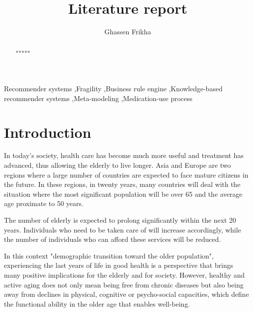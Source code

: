 \documentclass[preprint,3p,times,number]{elsarticle}
\begin{document}
\begin{frontmatter}


\title{Literature report}


\author[Mines-Albi]{Ghassen Frikha}

  
  
 \address[Mines-Albi]{Toulouse University, IMT Mines Albi, Department of Industrial Engineering, Route de Teillet, 81013 Albi Cedex 9, France}

\journal{ *** *** }


\begin{abstract}
*****
\end{abstract}

\begin{keyword} Recommender systems \sep Fragility \sep Business rule engine \sep Knowledge-based recommender systems \sep Meta-modeling \sep Medication-use process


\end{keyword}

\end{frontmatter}

\linenumbers
 \newcommand{\adobprim}{\textsc{adoBPRIM}}
\section{Introduction}
In today's society, health care has become much more useful and treatment has advanced, thus allowing the elderly to live longer. Asia and Europe are two regions where a large number of countries are expected to face mature citizens in the future. In these regions, in twenty years, many countries will deal with the situation where the most significant population will be over 65 and the average age proximate to 50 years. 

The number of elderly is expected to prolong significantly within the next 20 years. Individuals who need to be taken care of will increase accordingly, while the number of individuals who can afford these services will be reduced. 

In this context "demographic transition toward the older population", experiencing the last years of life in good health is a perspective that brings many positive implications for the elderly and for society. 
However, healthy and active aging does not only mean being free from chronic diseases but also being away from declines in physical, cognitive or psycho-social capacities, which define the functional ability in the older age that enables well-being.
\end{document}
